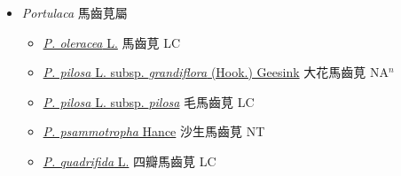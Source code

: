 
  \begin{itemize}
 \item[] \textit{Portulaca} 馬齒莧屬
                    
  \begin{itemize}
        \item[] \href{http://www.theplantlist.org/tpl1.1/search?q=Portulaca+oleracea}{\textit{P. oleracea} L.}   馬齒莧 LC
        \item[] \href{http://www.theplantlist.org/tpl1.1/search?q=Portulaca+pilosa+subsp.+grandiflora}{\textit{P. pilosa} L. subsp. \textit{grandiflora} (Hook.) Geesink}   大花馬齒莧 NA$^n$
        \item[] \href{http://www.theplantlist.org/tpl1.1/search?q=Portulaca+pilosa+subsp.+pilosa}{\textit{P. pilosa} L. subsp. \textit{pilosa}}   毛馬齒莧 LC
        \item[] \href{http://www.theplantlist.org/tpl1.1/search?q=Portulaca+psammotropha}{\textit{P. psammotropha} Hance}   沙生馬齒莧 NT
        \item[] \href{http://www.theplantlist.org/tpl1.1/search?q=Portulaca+quadrifida}{\textit{P. quadrifida} L.}   四瓣馬齒莧 LC
  \end{itemize}
  \end{itemize}
